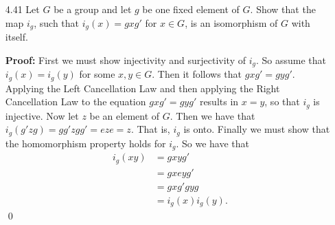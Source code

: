 \begin{enumerate}
      \textbf{Proof:} Since $\cdot$ is closed on $G$, it follows that $*$ is
      closed on $G$. Let $e$ be the identity of $\cyc{G, \cdot}$, and let
      $a, b, c \in G$. Since $a \cdot e = e \cdot a = a$, it follows that
      $e * a = a * e = a$, so that $e$ is also an identity of $\cyc{G, *}$.
      Similarly $a \cdot a' = a' \cdot a = e$ implies that
      $a' * a = a * a' = e$, so that every element of $G$ has an inverse under
      $*$. Also since $(c \cdot b) \cdot a = c \cdot (b \cdot a)$, it must be
      the case that $a * (b * c) = (a * b) * c$, so that the binary structure
      $\cyc{G, *}$ is associative. Thus $\cyc{G, *}$ is a group. Now we consider
      a map from $\cyc{G, *}$ to $\cyc{G, \cdot}$: $\phi : G \rightarrow G$ 
      defined by $\phi(g) = g'$, for all $g \in G$. If $\phi(x) = \phi(y)$ for
      some $x, y \in G$, then we have that $x' = y'$, and taking the inverse of
      both sides of the equation $x' = y'$ gives us $x = y$, so that the
      function $\phi$ is injective. For any $z \in G$, we have that
      $\phi(z') = (z')' = z$. Thus $\phi$ is onto. We have shown that $\phi$ is
      a bijection. Now it remains to show the homorphism property holds for
      $\phi$. Thus we
      have that
      \begin{align*}
         \phi(a * b) &= (a * b)'       \\
                     &= (b \cdot a)'   \\
                     &= a' \cdot b'    \\
                     &= \phi(a) \cdot \phi(b).
      \end{align*}
      That is $\cyc{G, *} \simeq \cyc{G, \cdot}$. \qed
   \item[4.41] Let $G$ be a group and let $g$ be one fixed element of $G$. Show
               that the map $i_g$, such that $i_g(x) = gxg'$ for $x \in G$, is
               an isomorphism of $G$ with itself.

      \textbf{Proof:} First we must show injectivity and surjectivity of $i_g$.
      So assume that $i_g(x) = i_g(y)$ for some $x, y \in G$. Then it follows
      that $gxg' = gyg'$. Applying the Left Cancellation Law and then applying
      the Right Cancellation Law to the equation $gxg' = gyg'$ results in
      $x = y$, so that $i_g$ is injective.  Now let $z$ be an element of $G$.
      Then we have that $i_g(g'zg) = gg'zgg' = eze = z$. That is, $i_g$ is onto.
      Finally we must show that the homomorphism property holds for $i_g$. So we
      have that
      \begin{align*}
         i_g(xy) &= gxyg'        \\
                 &= gxeyg'       \\
                 &= gxg'gyg      \\
                 &= i_g(x)i_g(y).
      \end{align*} \qed
\end{enumerate}
